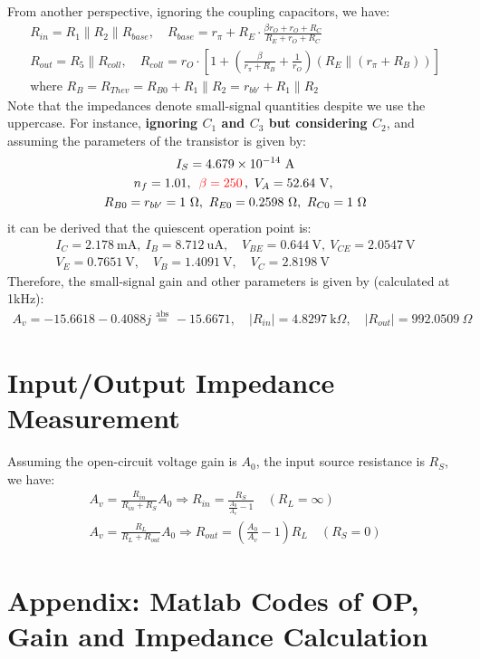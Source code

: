 \documentclass[UTF8]{article}
\begin{document}
\noindent 
From another perspective, ignoring the coupling capacitors, we have:
\begin{gather}
R_{in} = R_1 \parallel R_2 \parallel R_{base},\quad 
R_{base} = r_{\pi} + R_E \cdot \frac{\beta r_O + r_O + R_C}{R_E + r_O + R_C}
\\ 
R_{out} = R_5 \parallel R_{coll},\quad 
R_{coll} = r_O \cdot \left[ 1 + \left(\frac{\beta}{r_{\pi} + R_B} + \frac{1}{r_O}\right)\left(R_E \parallel (r_{\pi} + R_B)\right) \right]
\\
\text{where\ \ }
R_B = R_{Thev} = R_{B0} + R_1 \parallel R_2 = r_{bb'}  + R_1 \parallel R_2
\end{gather}
\noindent 
Note that the impedances denote small-signal quantities despite we use the uppercase. For instance, \textbf{ignoring $C_1$ and $C_3$ but considering $C_2$}, and assuming the parameters of the transistor is given by:
\begin{gather}
    I_S = 4.679 \times 10^{-14} \ \mathrm{A}\\
    n_f = 1.01,\ 
    {\color{red} \,\beta = 250\,},\ 
    V_A = 52.64 \ \mathrm{V},\ 
    \\
    R_{B0} = r_{bb'} = 1 \ \Omega,\ 
    R_{E0} = 0.2598 \ \Omega,\ 
    R_{C0} = 1 \ \Omega
\end{gather}
it can be derived that the quiescent operation point is:
\begin{gather}
I_C = 2.178 \ \mathrm{mA},\ 
I_B = 8.712 \ \mathrm{uA}
,\quad 
V_{BE} = 0.644 \ \mathrm{V},\ 
V_{CE} = 2.0547 \ \mathrm{V}
\\
V_E = 0.7651 \ \mathrm{V},\quad 
V_B = 1.4091 \ \mathrm{V},\quad 
V_C = 2.8198 \ \mathrm{V}
\end{gather}
Therefore, the small-signal gain and other parameters is given by (calculated at 1kHz):
\begin{gather}
A_v = -15.6618 - 0.4088j \overset{\mathrm{abs}}{\ =\ } -15.6671,\quad |R_{in}| = 4.8297 \ \mathrm{k}\Omega,\quad |R_{out}| = 992.0509 \ \Omega
\end{gather}

\section{Input/Output Impedance Measurement}

\noindent 
Assuming the open-circuit voltage gain is $A_{0}$, the input source resistance is $R_S$, we have:
\begin{gather}
A_v = \frac{R_{in}}{R_{in} + R_S} A_{0} \Longrightarrow 
R_{in} =  \frac{R_S}{\frac{A_0}{A_v} - 1} \quad (R_L = \infty)
\\ 
A_v = \frac{R_{L}}{R_{L} + R_{out}} A_{0} \Longrightarrow 
R_{out} = \left(\frac{A_0}{A_v} - 1\right) R_L \quad (R_S = 0)
\end{gather}












\section*{Appendix: Matlab Codes of OP, Gain and Impedance Calculation}
\thispagestyle{fancy} 

\end{document}
